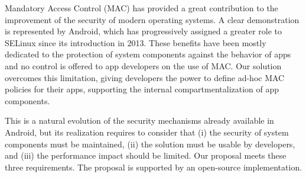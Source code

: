 Mandatory Access Control (MAC) has provided a great contribution to
the improvement of the security of modern operating systems.
A clear demonstration is represented by Android, which has progressively
assigned a greater role to SELinux since its introduction in
2013.
These benefits have been mostly dedicated to the protection of
system components against the behavior of apps and no control is
offered to app developers on the use of MAC.
Our solution  overcomes this limitation, giving developers the power to
define ad-hoc MAC policies for their apps, supporting the internal
compartmentalization of app components.

This is a natural evolution of the security mechanisms already
available in Android, but its realization requires to consider that
(i) the security of system components must be maintained, (ii) the
solution must be usable by developers, and (iii) the performance
impact should be limited.
Our proposal meets these three requirements.
The proposal is supported by an open-source implementation.

